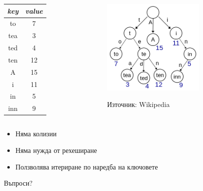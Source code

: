 \documentclass{beamer}
\begin{document}
\begin{columns}[t]
  \begin{column}{0.20\textwidth}


  	\begin{tabular}{c | c}
  		\textit{key} & \textit {value} \\\hline
  		to & 7 \\
  		tea & 3 \\
  		ted & 4 \\
  		ten & 12 \\
  		A & 15 \\
  		i & 11 \\
  		in & 5 \\
  		inn & 9 \\
  	\end{tabular}

  \end{column}
  \begin{column}{0.80\textwidth}
	\begin{center}
	\includegraphics[width=5cm]{images/trie}  
	\end{center}
	\begin{center}
	Източник: Wikipedia
	\end{center}

  \end{column}
\end{columns}

\begin{itemize}	
	\item Няма колизии
	\item Няма нужда от рехеширане
	\item Ползволява итериране по наредба на ключовете
\end{itemize}	



\begin{frame}
\centerline{Въпроси?}
\end{frame}
\end{document}
